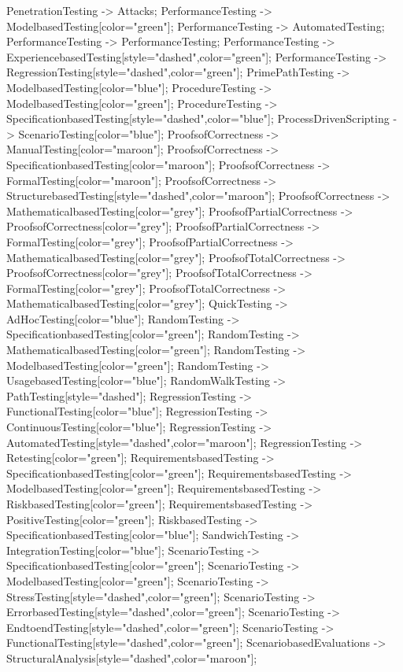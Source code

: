 \documentclass{article}
\begin{document}
{PenetrationTesting -> Attacks;
PerformanceTesting -> ModelbasedTesting[color="green"];
PerformanceTesting -> AutomatedTesting;
PerformanceTesting -> PerformanceTesting;
PerformanceTesting -> ExperiencebasedTesting[style="dashed",color="green"];
PerformanceTesting -> RegressionTesting[style="dashed",color="green"];
PrimePathTesting -> ModelbasedTesting[color="blue"];
ProcedureTesting -> ModelbasedTesting[color="green"];
ProcedureTesting -> SpecificationbasedTesting[style="dashed",color="blue"];
ProcessDrivenScripting -> ScenarioTesting[color="blue"];
ProofsofCorrectness -> ManualTesting[color="maroon"];
ProofsofCorrectness -> SpecificationbasedTesting[color="maroon"];
ProofsofCorrectness -> FormalTesting[color="maroon"];
ProofsofCorrectness -> StructurebasedTesting[style="dashed",color="maroon"];
ProofsofCorrectness -> MathematicalbasedTesting[color="grey"];
ProofsofPartialCorrectness -> ProofsofCorrectness[color="grey"];
ProofsofPartialCorrectness -> FormalTesting[color="grey"];
ProofsofPartialCorrectness -> MathematicalbasedTesting[color="grey"];
ProofsofTotalCorrectness -> ProofsofCorrectness[color="grey"];
ProofsofTotalCorrectness -> FormalTesting[color="grey"];
ProofsofTotalCorrectness -> MathematicalbasedTesting[color="grey"];
QuickTesting -> AdHocTesting[color="blue"];
RandomTesting -> SpecificationbasedTesting[color="green"];
RandomTesting -> MathematicalbasedTesting[color="green"];
RandomTesting -> ModelbasedTesting[color="green"];
RandomTesting -> UsagebasedTesting[color="blue"];
RandomWalkTesting -> PathTesting[style="dashed"];
RegressionTesting -> FunctionalTesting[color="blue"];
RegressionTesting -> ContinuousTesting[color="blue"];
RegressionTesting -> AutomatedTesting[style="dashed",color="maroon"];
RegressionTesting -> Retesting[color="green"];
RequirementsbasedTesting -> SpecificationbasedTesting[color="green"];
RequirementsbasedTesting -> ModelbasedTesting[color="green"];
RequirementsbasedTesting -> RiskbasedTesting[color="green"];
RequirementsbasedTesting -> PositiveTesting[color="green"];
RiskbasedTesting -> SpecificationbasedTesting[color="blue"];
SandwichTesting -> IntegrationTesting[color="blue"];
ScenarioTesting -> SpecificationbasedTesting[color="green"];
ScenarioTesting -> ModelbasedTesting[color="green"];
ScenarioTesting -> StressTesting[style="dashed",color="green"];
ScenarioTesting -> ErrorbasedTesting[style="dashed",color="green"];
ScenarioTesting -> EndtoendTesting[style="dashed",color="green"];
ScenarioTesting -> FunctionalTesting[style="dashed",color="green"];
ScenariobasedEvaluations -> StructuralAnalysis[style="dashed",color="maroon"];
}
\end{document}
